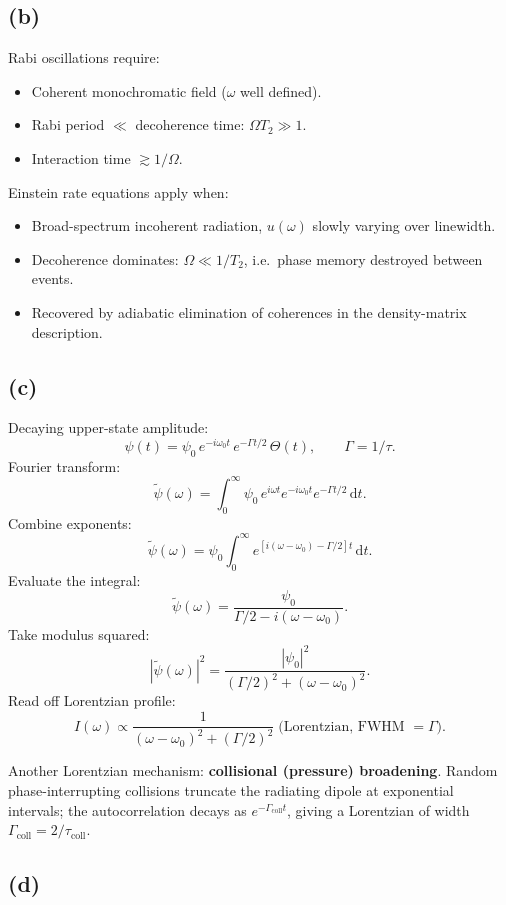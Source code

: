 \documentclass[11pt]{article}
\newcommand{\de}{\mathrm{d}}
\begin{document}
\subsection*{(b)}

Rabi oscillations require:
\begin{itemize}
\item Coherent monochromatic field ($\omega$ well defined).
\item Rabi period $\ll$ decoherence time: $\Omega T_2\gg 1$.
\item Interaction time $\gtrsim 1/\Omega$.
\end{itemize}
Einstein rate equations apply when:
\begin{itemize}
\item Broad-spectrum incoherent radiation, $u(\omega)$ slowly varying over linewidth.
\item Decoherence dominates: $\Omega\ll 1/T_2$, i.e.\ phase memory destroyed between events.
\item Recovered by adiabatic elimination of coherences in the density-matrix description.
\end{itemize}

\subsection*{(c)}

Decaying upper-state amplitude:
\[ \psi(t)=\psi_0\,e^{-i\omega_0 t}\,e^{-\Gamma t/2}\,\Theta(t),\qquad \Gamma=1/\tau. \]
Fourier transform:
\[ \tilde\psi(\omega)=\int_0^\infty \psi_0\,e^{i\omega t}e^{-i\omega_0 t}e^{-\Gamma t/2}\,\de t. \]
Combine exponents:
\[ \tilde\psi(\omega)=\psi_0\int_0^\infty e^{[i(\omega-\omega_0)-\Gamma/2]t}\,\de t. \]
Evaluate the integral:
\[ \tilde\psi(\omega)=\frac{\psi_0}{\Gamma/2-i(\omega-\omega_0)}. \]
Take modulus squared:
\[ |\tilde\psi(\omega)|^2=\frac{|\psi_0|^2}{(\Gamma/2)^2+(\omega-\omega_0)^2}. \]
Read off Lorentzian profile:
\[ \boxed{\;I(\omega)\propto\frac{1}{(\omega-\omega_0)^2+(\Gamma/2)^2}\;\text{(Lorentzian, FWHM }=\Gamma).\;} \]

Another Lorentzian mechanism: \textbf{collisional (pressure) broadening}. Random phase-interrupting collisions truncate the radiating dipole at exponential intervals; the autocorrelation decays as $e^{-\Gamma_\text{coll}t}$, giving a Lorentzian of width $\Gamma_\text{coll}=2/\tau_\text{coll}$.

\subsection*{(d)}
\end{document}
